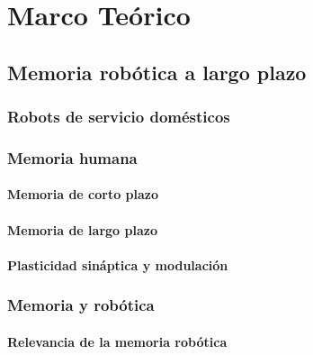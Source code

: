 \chapter{Marco Teórico}\label{chapter:theory}




\section{Memoria robótica a largo plazo}

\subsection{Robots de servicio domésticos}

\subsection{Memoria humana}

\subsubsection{Memoria de corto plazo}

\subsubsection{Memoria de largo plazo}

\subsubsection{Plasticidad sináptica y modulación}
 
\subsection{Memoria y robótica}

\subsubsection{Relevancia de la memoria robótica}

